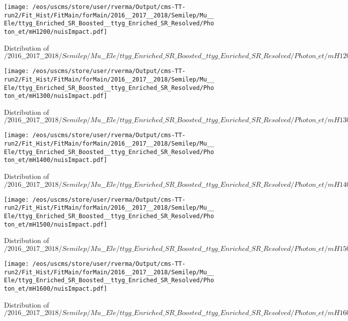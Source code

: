 \begin{figure}
\centering
\texttt{[image: /eos/uscms/store/user/rverma/Output/cms-TT-run2/Fit\_Hist/FitMain/forMain/2016\_\_2017\_\_2018/Semilep/Mu\_\_Ele/ttyg\_Enriched\_SR\_Boosted\_\_ttyg\_Enriched\_SR\_Resolved/Photon\_et/mH1200/nuisImpact.pdf]}
\caption{Distribution of $/2016\_\_2017\_\_2018/Semilep/Mu\_\_Ele/ttyg\_Enriched\_SR\_Boosted\_\_ttyg\_Enriched\_SR\_Resolved/Photon\_et/mH1200/nuisImpact.pdf$}
\end{figure}

\begin{figure}
\centering
\texttt{[image: /eos/uscms/store/user/rverma/Output/cms-TT-run2/Fit\_Hist/FitMain/forMain/2016\_\_2017\_\_2018/Semilep/Mu\_\_Ele/ttyg\_Enriched\_SR\_Boosted\_\_ttyg\_Enriched\_SR\_Resolved/Photon\_et/mH1300/nuisImpact.pdf]}
\caption{Distribution of $/2016\_\_2017\_\_2018/Semilep/Mu\_\_Ele/ttyg\_Enriched\_SR\_Boosted\_\_ttyg\_Enriched\_SR\_Resolved/Photon\_et/mH1300/nuisImpact.pdf$}
\end{figure}

\begin{figure}
\centering
\texttt{[image: /eos/uscms/store/user/rverma/Output/cms-TT-run2/Fit\_Hist/FitMain/forMain/2016\_\_2017\_\_2018/Semilep/Mu\_\_Ele/ttyg\_Enriched\_SR\_Boosted\_\_ttyg\_Enriched\_SR\_Resolved/Photon\_et/mH1400/nuisImpact.pdf]}
\caption{Distribution of $/2016\_\_2017\_\_2018/Semilep/Mu\_\_Ele/ttyg\_Enriched\_SR\_Boosted\_\_ttyg\_Enriched\_SR\_Resolved/Photon\_et/mH1400/nuisImpact.pdf$}
\end{figure}

\begin{figure}
\centering
\texttt{[image: /eos/uscms/store/user/rverma/Output/cms-TT-run2/Fit\_Hist/FitMain/forMain/2016\_\_2017\_\_2018/Semilep/Mu\_\_Ele/ttyg\_Enriched\_SR\_Boosted\_\_ttyg\_Enriched\_SR\_Resolved/Photon\_et/mH1500/nuisImpact.pdf]}
\caption{Distribution of $/2016\_\_2017\_\_2018/Semilep/Mu\_\_Ele/ttyg\_Enriched\_SR\_Boosted\_\_ttyg\_Enriched\_SR\_Resolved/Photon\_et/mH1500/nuisImpact.pdf$}
\end{figure}

\begin{figure}
\centering
\texttt{[image: /eos/uscms/store/user/rverma/Output/cms-TT-run2/Fit\_Hist/FitMain/forMain/2016\_\_2017\_\_2018/Semilep/Mu\_\_Ele/ttyg\_Enriched\_SR\_Boosted\_\_ttyg\_Enriched\_SR\_Resolved/Photon\_et/mH1600/nuisImpact.pdf]}
\caption{Distribution of $/2016\_\_2017\_\_2018/Semilep/Mu\_\_Ele/ttyg\_Enriched\_SR\_Boosted\_\_ttyg\_Enriched\_SR\_Resolved/Photon\_et/mH1600/nuisImpact.pdf$}
\end{figure}

